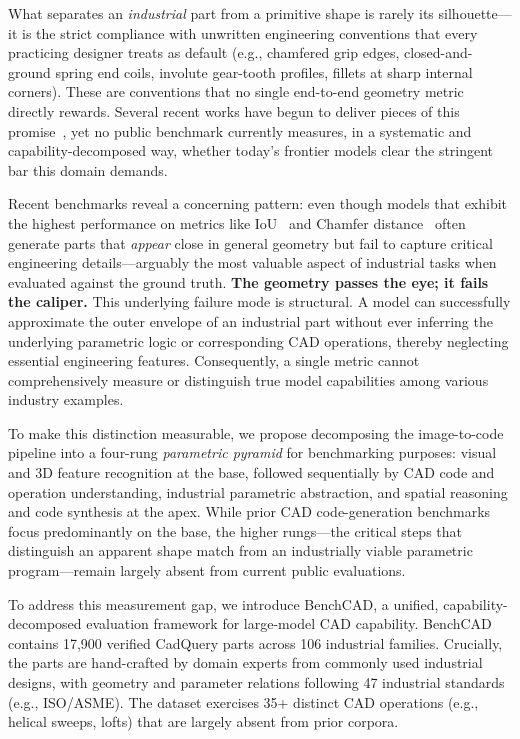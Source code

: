 What separates an \emph{industrial} part from a primitive shape is rarely its silhouette---it is the strict compliance with unwritten engineering conventions that every practicing designer treats as default (e.g., chamfered grip edges, closed-and-ground spring end coils, involute gear-tooth profiles, fillets at sharp internal corners). These are conventions that no single end-to-end geometry metric directly rewards.
Several recent works have begun to deliver pieces of this promise~\citep{Khan2024,Guan2025,Rukhovich2025,Alrashedy2025,Kolodiazhnyi2026}, yet no public benchmark currently measures, in a systematic and capability-decomposed way, whether today's frontier models clear the stringent bar this domain demands. 

Recent benchmarks reveal a concerning pattern: even though models that exhibit the highest performance on metrics like IoU~\citep{Wu2021,Khan2024} and Chamfer distance~\citep{Guan2025,Rukhovich2025} often generate parts that \emph{appear} close in general geometry but fail to capture critical engineering details—arguably the most valuable aspect of industrial tasks when evaluated against the ground truth. 
\textbf{The geometry passes the eye; it fails the caliper.} This underlying failure mode is structural. 
A model can successfully approximate the outer envelope of an industrial part without ever inferring the underlying parametric logic or corresponding CAD operations, thereby neglecting essential engineering features. 
Consequently, a single metric cannot comprehensively measure or distinguish true model capabilities among various industry examples.

To make this distinction measurable, we propose decomposing the image-to-code pipeline into a four-rung \emph{parametric pyramid} for benchmarking purposes: 
visual and 3D feature recognition at the base, followed sequentially by CAD code and operation understanding, industrial parametric abstraction, and spatial reasoning and code synthesis at the apex. 
While prior CAD code-generation benchmarks~\citep{Wu2021,Khan2024,Guan2025,Rukhovich2025,Kolodiazhnyi2026,Elistratov2026} focus predominantly on the base, the higher rungs—the critical steps that distinguish an apparent shape match from an industrially viable parametric program—remain largely absent from current public evaluations.

To address this measurement gap, we introduce BenchCAD, a unified, capability-decomposed evaluation framework for large-model CAD capability. BenchCAD contains 17{,}900 verified CadQuery parts across 106 industrial families.
Crucially, the parts are hand-crafted by domain experts from commonly used industrial designs, with geometry and parameter relations following 47 industrial standards (e.g., ISO/ASME). The dataset exercises 35+ distinct CAD operations (e.g., helical sweeps, lofts) that are largely absent from prior corpora.

